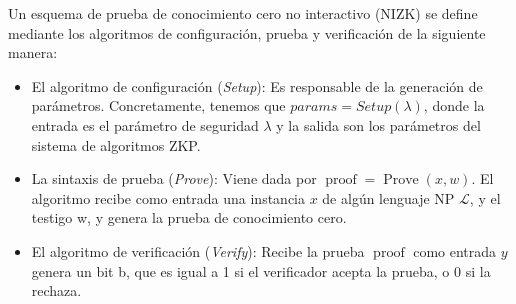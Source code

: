 Un esquema de prueba de conocimiento cero no interactivo (NIZK) se define mediante los algoritmos de configuración, prueba y verificación de la siguiente manera:
\begin{itemize}
    \item El algoritmo de configuración (\emph{Setup}): Es responsable de la generación de parámetros. Concretamente, tenemos que $params = Setup(\lambda)$, donde la entrada es el parámetro de seguridad $\lambda$ y la salida son los parámetros del sistema de algoritmos ZKP.

    \item La sintaxis de prueba (\emph{Prove}): Viene dada por $\operatorname{proof} = \operatorname{Prove}(x, w)$. El algoritmo recibe como entrada una instancia $x$ de algún lenguaje NP $\mathcal{L}$, y el testigo w, y genera la prueba de conocimiento cero.

    \item El algoritmo de verificación (\emph{Verify}): Recibe la prueba $\operatorname{proof}$ como entrada $y$ genera un bit b, que es igual a 1 si el verificador acepta la prueba, o 0 si la rechaza.
\end{itemize}

